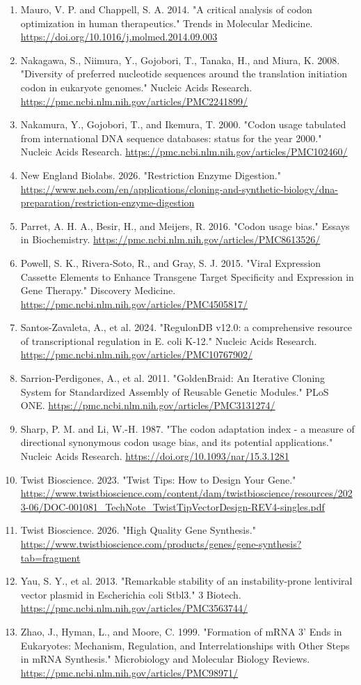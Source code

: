 \documentclass[11pt]{report}
\begin{document}
\begin{enumerate}
\item Mauro, V. P. and Chappell, S. A. 2014. "A critical analysis of codon optimization in human therapeutics." Trends in Molecular Medicine. \url{https://doi.org/10.1016/j.molmed.2014.09.003}
\item Nakagawa, S., Niimura, Y., Gojobori, T., Tanaka, H., and Miura, K. 2008. "Diversity of preferred nucleotide sequences around the translation initiation codon in eukaryote genomes." Nucleic Acids Research. \url{https://pmc.ncbi.nlm.nih.gov/articles/PMC2241899/}
\item Nakamura, Y., Gojobori, T., and Ikemura, T. 2000. "Codon usage tabulated from international DNA sequence databases: status for the year 2000." Nucleic Acids Research. \url{https://pmc.ncbi.nlm.nih.gov/articles/PMC102460/}
\item New England Biolabs. 2026. "Restriction Enzyme Digestion." \url{https://www.neb.com/en/applications/cloning-and-synthetic-biology/dna-preparation/restriction-enzyme-digestion}
\item Parret, A. H. A., Besir, H., and Meijers, R. 2016. "Codon usage bias." Essays in Biochemistry. \url{https://pmc.ncbi.nlm.nih.gov/articles/PMC8613526/}
\item Powell, S. K., Rivera-Soto, R., and Gray, S. J. 2015. "Viral Expression Cassette Elements to Enhance Transgene Target Specificity and Expression in Gene Therapy." Discovery Medicine. \url{https://pmc.ncbi.nlm.nih.gov/articles/PMC4505817/}
\item Santos-Zavaleta, A., et al. 2024. "RegulonDB v12.0: a comprehensive resource of transcriptional regulation in E. coli K-12." Nucleic Acids Research. \url{https://pmc.ncbi.nlm.nih.gov/articles/PMC10767902/}
\item Sarrion-Perdigones, A., et al. 2011. "GoldenBraid: An Iterative Cloning System for Standardized Assembly of Reusable Genetic Modules." PLoS ONE. \url{https://pmc.ncbi.nlm.nih.gov/articles/PMC3131274/}
\item Sharp, P. M. and Li, W.-H. 1987. "The codon adaptation index - a measure of directional synonymous codon usage bias, and its potential applications." Nucleic Acids Research. \url{https://doi.org/10.1093/nar/15.3.1281}
\item Twist Bioscience. 2023. "Twist Tips: How to Design Your Gene." \url{https://www.twistbioscience.com/content/dam/twistbioscience/resources/2023-06/DOC-001081_TechNote_TwistTipVectorDesign-REV4-singles.pdf}
\item Twist Bioscience. 2026. "High Quality Gene Synthesis." \url{https://www.twistbioscience.com/products/genes/gene-synthesis?tab=fragment}
\item Yau, S. Y., et al. 2013. "Remarkable stability of an instability-prone lentiviral vector plasmid in Escherichia coli Stbl3." 3 Biotech. \url{https://pmc.ncbi.nlm.nih.gov/articles/PMC3563744/}
\item Zhao, J., Hyman, L., and Moore, C. 1999. "Formation of mRNA 3' Ends in Eukaryotes: Mechanism, Regulation, and Interrelationships with Other Steps in mRNA Synthesis." Microbiology and Molecular Biology Reviews. \url{https://pmc.ncbi.nlm.nih.gov/articles/PMC98971/}
\end{enumerate}
\end{document}
